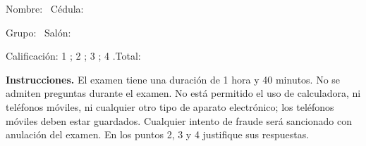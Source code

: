 \documentclass[11pt]{article}
\begin{document}
\examheader

\vspace{4pt}
\noindent Nombre: \dotfill\ Cédula: \dotfill

\vspace{4pt}
\noindent Grupo: \dotfill\ Salón: \dotfill

\vspace{4pt}
\noindent Calificación: 1 \dotfill; 2 \dotfill; 3 \dotfill; 4 \dotfill.\quad Total: \dotfill

\vspace{6pt}
\noindent\textbf{Instrucciones.} El examen tiene una duración de 1 hora y 40 minutos. No se admiten preguntas durante el examen. No está permitido el uso de calculadora, ni teléfonos móviles, ni cualquier otro tipo de aparato electrónico; los teléfonos móviles deben estar guardados. Cualquier intento de fraude será sancionado con anulación del examen. En los puntos 2, 3 y 4 justifique sus respuestas.
\end{document}
